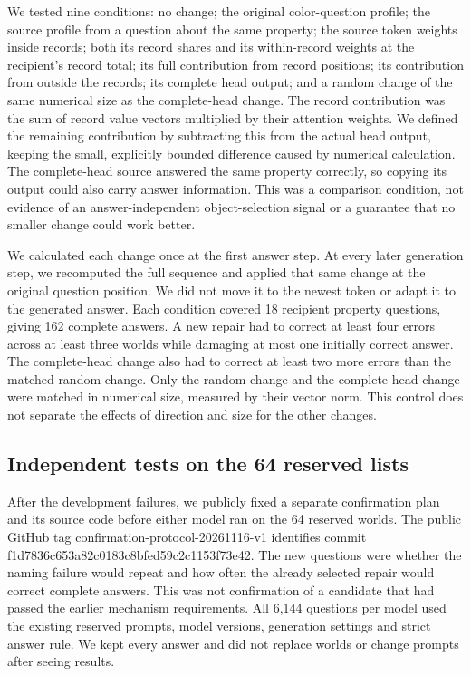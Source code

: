 \documentclass[10pt,letterpaper]{article}
\begin{document}
We tested nine conditions: no change; the original color-question profile; the source profile from a question about the same property; the source token weights inside records; both its record shares and its within-record weights at the recipient's record total; its full contribution from record positions; its contribution from outside the records; its complete head output; and a random change of the same numerical size as the complete-head change. The record contribution was the sum of record value vectors multiplied by their attention weights. We defined the remaining contribution by subtracting this from the actual head output, keeping the small, explicitly bounded difference caused by numerical calculation. The complete-head source answered the same property correctly, so copying its output could also carry answer information. This was a comparison condition, not evidence of an answer-independent object-selection signal or a guarantee that no smaller change could work better.


We calculated each change once at the first answer step. At every later generation step, we recomputed the full sequence and applied that same change at the original question position. We did not move it to the newest token or adapt it to the generated answer. Each condition covered 18 recipient property questions, giving 162 complete answers. A new repair had to correct at least four errors across at least three worlds while damaging at most one initially correct answer. The complete-head change also had to correct at least two more errors than the matched random change. Only the random change and the complete-head change were matched in numerical size, measured by their vector norm. This control does not separate the effects of direction and size for the other changes.


\subsection*{Independent tests on the 64 reserved lists}

After the development failures, we publicly fixed a separate confirmation plan and its source code before either model ran on the 64 reserved worlds. The public GitHub tag confirmation-protocol-20261116-v1 identifies commit f1d7836c653a82c0183c8bfed59c2c1153f73e42. The new questions were whether the naming failure would repeat and how often the already selected repair would correct complete answers. This was not confirmation of a candidate that had passed the earlier mechanism requirements. All 6,144 questions per model used the existing reserved prompts, model versions, generation settings and strict answer rule. We kept every answer and did not replace worlds or change prompts after seeing results.
\end{document}
